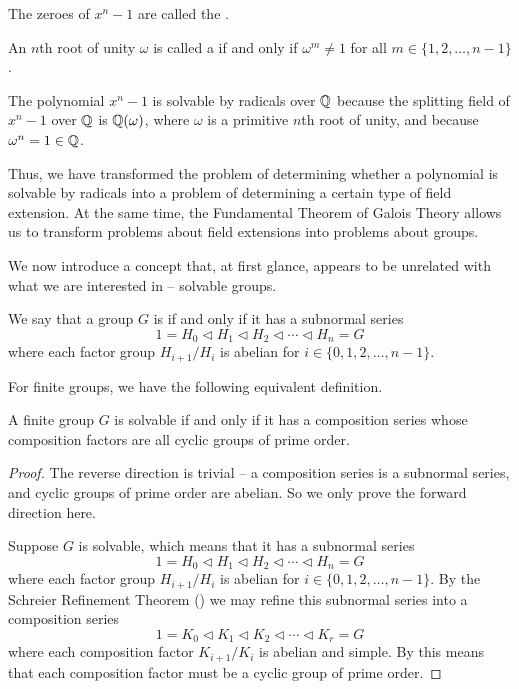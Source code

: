 \begin{definition}
    The zeroes of $x^n - 1$ are called the .
\end{definition}

\begin{definition}
    An $n$th root of unity $\omega$ is called a  if and only if $\omega^m \neq 1$ for all $m \in \{1, 2, \dots, n-1\}$.
\end{definition}

\begin{example}
    The polynomial $x^n - 1$ is solvable by radicals over $\mathbb{Q}$ because the splitting field of $x^n - 1$ over $\mathbb{Q}$ is $\mathbb{Q}(\omega)$, where $\omega$ is a primitive $n$th root of unity, and because $\omega^n = 1 \in \mathbb{Q}$.
\end{example}

Thus, we have transformed the problem of determining whether a polynomial is solvable by radicals into a problem of determining a certain type of field extension. At the same time, the Fundamental Theorem of Galois Theory allows us to transform problems about field extensions into problems about groups.

We now introduce a concept that, at first glance, appears to be unrelated with what we are interested in -- solvable groups.

\begin{definition}
    We say that a group $G$ is  if and only if it has a subnormal series
    \[
        1 = H_0 \lhd H_1 \lhd H_2 \lhd \cdots \lhd H_n = G
    \]
    where each factor group $H_{i+1}/H_i$ is abelian for $i \in \{0, 1, 2, \dots, n-1\}$.
\end{definition}

For finite groups, we have the following equivalent definition.

\begin{proposition}\label{prop-solvable-equivalence-for-finite-groups}
    A finite group $G$ is solvable if and only if it has a composition series whose composition factors are all cyclic groups of prime order.
\end{proposition}
\begin{proof}
    The reverse direction is trivial -- a composition series is a subnormal series, and cyclic groups of prime order are abelian. So we only prove the forward direction here.

    Suppose $G$ is solvable, which means that it has a subnormal series
    \[
        1 = H_0 \lhd H_1 \lhd H_2 \lhd \cdots \lhd H_n = G
    \]
    where each factor group $H_{i+1}/H_i$ is abelian for $i \in \{0, 1, 2, \dots, n-1\}$. By the Schreier Refinement Theorem () we may refine this subnormal series into a composition series
    \[
        1 = K_0 \lhd K_1 \lhd K_2 \lhd \cdots \lhd K_r = G
    \]
    where each composition factor $K_{i+1}/K_i$ is abelian and simple. By  this means that each composition factor must be a cyclic group of prime order.
\end{proof}

